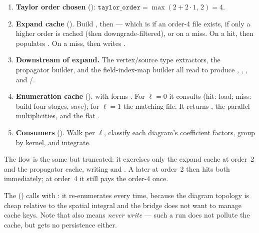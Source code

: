 \begin{enumerate}
  \item \textbf{Taylor order chosen} ():
        $\texttt{taylor\_order} = \max(2 + 2\cdot 1,\, 2) = 4$.
  \item \textbf{Expand cache} (). Build
        , then
         --- which is
         if an order-4 file exists,  if only a higher order is
        cached (then downgrade-filtered), or  on a miss. On a hit,
         then
        populates . On a miss,  then
         writes .
  \item \textbf{Downstream of expand.} The vertex/source type extractors, the
        propagator builder, and the field-index-map builder all read
         to produce , ,
        , and /.
  \item \textbf{Enumeration cache} ().
         with
         forms
        . For
        $\ell=0$ it consults
         (hit:
        load; miss: build four stages, save); for $\ell=1$ the matching
         file. It returns
        , the parallel
        multiplicities, and the flat .
  \item \textbf{Consumers} (). Walk 
        per $\ell$, classify each diagram's coefficient factors, group by
        kernel, and integrate.
\end{enumerate}

The  flow is the same but truncated: it exercises only the
expand cache at order~2 and the propagator cache, writing
 and . A later
 at order~2 then hits both immediately; at order~4 it
still pays the order-4  once.

\begin{note}
The  ()
calls  with : it
re-enumerates every time, because the diagram topology is cheap relative to the
spatial integral and the bridge does not want to manage cache keys. Note that
 also means \emph{never write} --- such a run does not
pollute the cache, but gets no persistence either.
\end{note}

